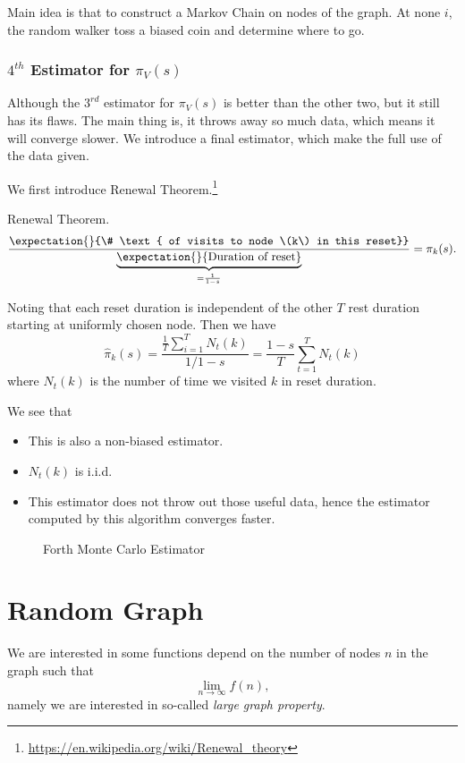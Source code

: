 \begin{prev}
	Main idea is that to construct a Markov Chain on nodes of the graph. At none \(i\), the random walker toss a biased coin and
	determine where to go.
\end{prev}

\subsubsection{\(4^{th}\) Estimator for \(\pi_V(s)\)}
Although the \(3^{rd}\) estimator for \(\pi_V(s)\) is better than the other two, but it still has its flaws. The main thing is, it throws away so much
data, which means it will converge slower. We introduce a final estimator, which make the full use of the data given.

We first introduce Renewal Theorem.\footnote{\url{https://en.wikipedia.org/wiki/Renewal_theory}}
\begin{theorem}
	Renewal Theorem.
	\[
		\frac{\expectation{}{\# \text{ of visits to node \(k\) in this reset}} }{\underbrace{\expectation{}{\text{Duration of reset}}}_{= \frac{1}{1-s}}} = \pi_k(s).
	\]

	Noting that each reset duration is independent of the other \(T\) rest duration starting at uniformly chosen node. Then we have
	\[
		\hat{\pi}_k(s) = \frac{\frac{1}{T}\sum\limits_{i=1}^{T} N_t(k)}{1/1-s} = \frac{1-s}{T}\sum\limits_{t=1}^{T} N_t(k)
	\]
	where \(N_t(k)\) is the number of time we visited \(k\) in reset duration.
\end{theorem}

\begin{remark}
	We see that
	\begin{itemize}
		\item This is also a non-biased estimator.
		\item \(N_t(k)\) is i.i.d.
		\item This estimator does not throw out those useful data, hence the estimator computed by this algorithm converges faster.
	\end{itemize}
\end{remark}

\begin{figure}[H]
	\centering
	\caption{Forth Monte Carlo Estimator}
	\label{fig:Monte-Carlo-Estimator-4}
\end{figure}

\section{Random Graph}
We are interested in some functions depend on the number of nodes \(n\) in the graph such that
\[
	\lim_{n\to \infty }f(n),
\]
namely we are interested in so-called \emph{large graph property}.
